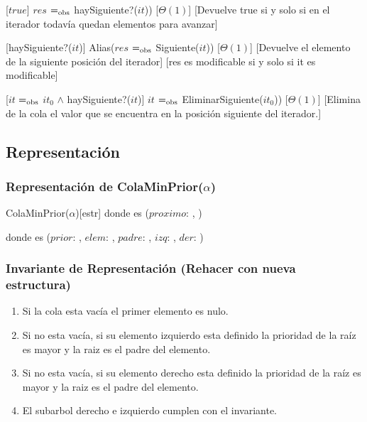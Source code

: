 	[$true$]
	{$res$ $=_{\mathrm{obs}}$ haySiguiente?($it$))}
	[$\Theta(1)$]
	[Devuelve true si y solo si en el iterador todavía quedan elementos para avanzar]

	[haySiguiente?($it$)]
	{Alias($res$ $=_{\mathrm{obs}}$ Siguiente($it$))}
	[$\Theta(1)$]
	[Devuelve el elemento de la siguiente posición del iterador]
	[res es modificable si y solo si it es modificable]

	[$it$ $=_{\mathrm{obs}}$ $it_0$ $\wedge$ haySiguiente?($it$)]
	{$it$ $=_{\mathrm{obs}}$ EliminarSiguiente($it_0$))}
	[$\Theta(1)$]
	[Elimina de la cola el valor que se encuentra en la posición siguiente del iterador.]
	
\subsection{Representación}

	\subsubsection{Representación de ColaMinPrior($\alpha$)}

		\begin{Estructura}{ColaMinPrior($\alpha$)}[estr]
			\- \- \- \- donde  es ($proximo$: ,
			)
			
			\- \- \- \- donde  es ($prior$: , $elem$: \TipoVariable{$\alpha$}, $padre$: , $izq$: , $der$: )
			
		\end{Estructura}

	\subsubsection{Invariante de Representación (Rehacer con nueva estructura)}

		\renewcommand{\labelenumi}{(\Roman{enumi})}

		\begin{enumerate}
			\item Si la cola esta vacía el primer elemento es nulo.
			\item Si no esta vacía, si su elemento izquierdo esta definido la prioridad de la raíz es mayor y la raiz es el padre del elemento.
			\item Si no esta vacía, si su elemento derecho esta definido la prioridad de la raíz es mayor y la raiz es el padre del elemento.
			\item El subarbol derecho e izquierdo cumplen con el invariante.
		\end{enumerate}

